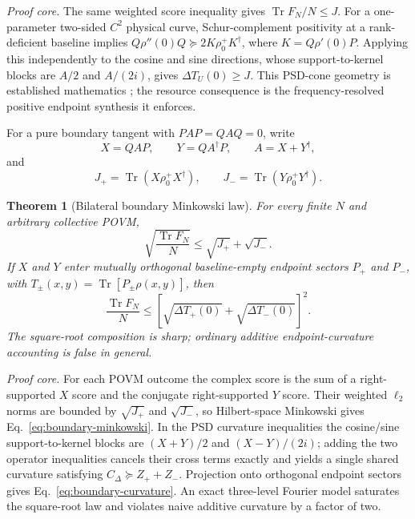 \documentclass[aps,pra,preprint,nofootinbib]{revtex4-2}
\newtheorem{theorem}{Theorem}
\newcommand{\Tr}{\operatorname{Tr}}
\newcommand{\rhozero}{\rho_0}
\newcommand{\Fcl}{F}
\begin{document}
\emph{Proof core.} The same weighted score inequality gives $\Tr F_N/N\le J$. For a one-parameter two-sided $C^2$ physical curve, Schur-complement positivity at a rank-deficient baseline implies $Q\rho''(0)Q\succeq2K\rhozero^+K^\dagger$, where $K=Q\rho'(0)P$. Applying this independently to the cosine and sine directions, whose support-to-kernel blocks are $A/2$ and $A/(2i)$, gives $\Delta T_U(0)\ge J$. This PSD-cone geometry is established mathematics \cite{Shapiro1997,BonnansCominettiShapiro1999}; the resource consequence is the frequency-resolved positive endpoint synthesis it enforces.

For a pure boundary tangent with $PAP=QAQ=0$, write
\begin{equation}
X=QAP,\qquad Y=QA^\dagger P,\qquad A=X+Y^\dagger,
\end{equation}
and
\begin{equation}
J_+=\Tr(X\rhozero^+X^\dagger),\qquad
J_-=\Tr(Y\rhozero^+Y^\dagger).
\end{equation}

\begin{theorem}[Bilateral boundary Minkowski law]
\label{thm:bilateral-boundary}
For every finite $N$ and arbitrary collective POVM,
\begin{equation}
\boxed{
\sqrt{\frac{\Tr \Fcl_N}{N}}
\le \sqrt{J_+}+\sqrt{J_-}.
}
\label{eq:boundary-minkowski}
\end{equation}
If $X$ and $Y$ enter mutually orthogonal baseline-empty endpoint sectors $P_+$ and $P_-$, with $T_\pm(x,y)=\Tr[P_\pm\rho(x,y)]$, then
\begin{equation}
\boxed{
\frac{\Tr \Fcl_N}{N}
\le
\left[\sqrt{\Delta T_+(0)}+\sqrt{\Delta T_-(0)}\right]^2.
}
\label{eq:boundary-curvature}
\end{equation}
The square-root composition is sharp; ordinary additive endpoint-curvature accounting is false in general.
\end{theorem}

\emph{Proof core.} For each POVM outcome the complex score is the sum of a right-supported $X$ score and the conjugate right-supported $Y$ score. Their weighted $\ell_2$ norms are bounded by $\sqrt{J_+}$ and $\sqrt{J_-}$, so Hilbert-space Minkowski gives Eq.~\eqref{eq:boundary-minkowski}. In the PSD curvature inequalities the cosine/sine support-to-kernel blocks are $(X+Y)/2$ and $(X-Y)/(2i)$; adding the two operator inequalities cancels their cross terms exactly and yields a single shared curvature satisfying $C_\Delta\succeq Z_++Z_-$. Projection onto orthogonal endpoint sectors gives Eq.~\eqref{eq:boundary-curvature}. An exact three-level Fourier model saturates the square-root law and violates naive additive curvature by a factor of two.
\end{document}
